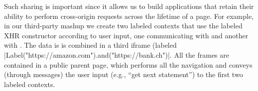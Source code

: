 Such sharing is important since it allows us to build applications
that retain their ability to perform cross-origin requests across the
lifetime of a page.
%
For example, in our third-party mashup we create two labeled contexts
that use the labeled XHR constructor according to user input, one
communicating with  and another with
.
%
The data is is combined in a third iframe (labeled
\js|Label("https://amazon.com").and("https://bank.ch")|.
%
All the frames are contained in a public parent page,
which performs all the navigation and conveys (through messages)
the user input (e.g., ``get next statement'') to the first two
labeled contexts.


